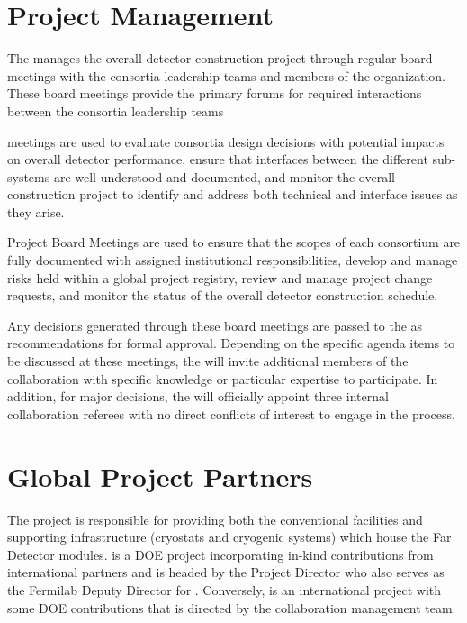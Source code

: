 \section{Project Management}
\label{sec:pm}

The  manages the overall detector construction
project through regular board meetings with the consortia leadership
teams and members of the  organization.  These
board meetings provide the primary forums for required interactions
between the consortia leadership teams

 meetings are used to evaluate consortia design
decisions with potential impacts on overall detector performance,
ensure that interfaces between the different sub-systems are well
understood and documented, and monitor the overall construction
project to identify and address both technical and interface issues as
they arise.

Project Board Meetings are used to ensure that the scopes of each
consortium are fully documented with assigned institutional
responsibilities, develop and manage risks held within a global
project registry, review and manage project change requests, and
monitor the status of the overall detector construction schedule.

Any decisions generated through these board meetings are passed to the
  as recommendations for formal approval.
Depending on the specific agenda items to be discussed at these
meetings, the  will invite additional members of
the collaboration with specific knowledge or particular expertise to
participate.  In addition, for major decisions, the 
will officially appoint three internal collaboration
referees with no direct conflicts of interest to engage in the
process.

\section{Global Project Partners}
\label{sec:partners}

The  project is responsible for providing both the conventional
facilities and supporting infrastructure (cryostats and cryogenic
systems) which house the  Far Detector modules.  is a  DOE
project incorporating in-kind contributions from international
partners and is headed by the  Project Director who also serves as
the Fermilab Deputy Director for .  Conversely,  is an
international project with some  DOE contributions that is
directed by the  collaboration management team.

